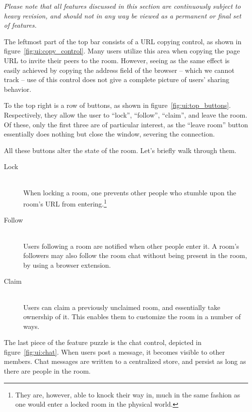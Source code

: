 \emph{Please note that all features discussed in this section are continuously subject to heavy revision, and should not in any way be viewed as a permanent or final set of features.}

The leftmost part of the top bar consists of a URL copying control, as shown in figure~\ref{fig:ui:copy_control}. Many users utilize this area when copying the page URL to invite their peers to the room. However, seeing as the same effect is easily achieved by copying the address field of the browser -- which we cannot track -- use of this control does not give a complete picture of users' sharing behavior.

To the top right is a row of buttons, as shown in figure~\ref{fig:ui:top_buttons}. Respectively, they allow the user to ``lock'', ``follow'', ``claim'', and leave the room. Of these, only the first three are of particular interest, as the ``leave room'' button essentially does nothing but close the window, severing the connection.

All these buttons alter the state of the room. Let's briefly walk through them.

\begin{description}
  \item[Lock] \hfill \\
    When locking a room, one prevents other people who stumble upon the room's URL from entering.\footnote{They are, however, able to knock their way in, much in the same fashion as one would enter a locked room in the physical world.}
  \item[Follow] \hfill \\
    Users following a room are notified when other people enter it. A room's followers may also follow the room chat without being present in the room, by using a browser extension.
  \item[Claim] \hfill \\
    Users can claim a previously unclaimed room, and essentially take ownership of it. This enables them to customize the room in a number of ways.
\end{description}

The last piece of the feature puzzle is the chat control, depicted in figure~\ref{fig:ui:chat}. When users post a message, it becomes visible to other members. Chat messages are written to a centralized store, and persist as long as there are people in the room.

